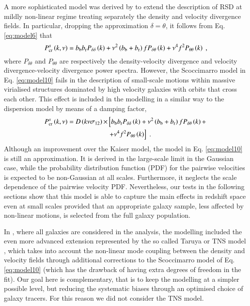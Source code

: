 \documentclass[longauth]{aa}
\def\({\left(}
\def\){\right)}
\def\[{\left[}
\def\]{\right]}
\begin{document}
A more sophisticated model was derived by \citet{scoccimarro04} to extend the description of RSD at mildly non-linear regime treating separately the density and velocity divergence fields. In particular, dropping the approximation $\delta=\theta$, it follows from Eq. \eqref{eq:model6} that
	\begin{equation}
		P^s_{\rm{cr}}\(k,\nu\)=b_{\rm{b}}b_{\rm{r}}P_{\delta\delta}\(k\)+\nu^2\(b_{\rm{b}}+b_{\rm{r}}\)fP_{\delta\theta}\(k\)+\nu^4 f^2P_{\theta\theta}\(k\)\; ,					\label{eq:model10}
	\end{equation}
where $P_{\delta\theta}$ and $P_{\theta\theta}$ are respectively the density-velocity divergence and velocity divergence-velocity divergence power spectra. However, the Scoccimarro model in Eq. \eqref{eq:model10} fails in the description of small-scale motions within massive virialised structures dominated by high velocity galaxies with orbits that cross each other. This effect is included in the modelling in a similar way to the dispersion model by means of a damping factor,
	\begin{equation}
    	\begin{split}
		P^s_{\rm{cr}}\(k,\nu\) 	= D\(k\nu\sigma_{12}\)\times&\[b_{\rm{b}}b_{\rm{r}}P_{\delta\delta}\(k\)+\nu^2\(b_{\rm{b}}+b_{\rm{r}}\)fP_{\delta\theta}\(k\)+\right.\\
        &\left.+\nu^4 f^2P_{\theta\theta}\(k\)\]\; . \label{eq:model11}
		\end{split}
	\end{equation}
Although an improvement over the Kaiser model, the model in Eq. \eqref{eq:model10} is still an approximation. It is derived in the large-scale limit in the Gaussian case, while the probability distribution function (PDF) for the pairwise velocities is expected to be non-Gaussian at all scales. Furthermore, it neglects the scale dependence of the pairwise velocity PDF. Nevertheless, our tests in the following sections show that this model is able to capture the main effects in redshift space even at small scales provided that an appropriate galaxy sample, less affected by non-linear motions, is selected from the full galaxy population.

In \citet{pezzotta16}, where all galaxies are considered in the analysis, the modelling included the even more advanced extension represented by the so called Taruya or TNS model \citep{taruya10}, which takes into account the non-linear mode coupling between the density and velocity fields through additional corrections to the Scoccimarro model of Eq. \eqref{eq:model10} (which has the drawback of having extra degrees of freedom in the fit). Our goal here is complementary, that is to keep the modelling at a simpler possible level, but reducing the systematic biases through an optimised choice of galaxy tracers. For this reason we did not consider the TNS model.
\end{document}
